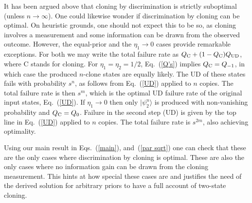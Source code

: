 \documentclass[aps,prl,twocolumn,showpacs]{revtex4}
\begin{document}
It has been argued above that cloning by discrimination is strictly suboptimal (unless $n\to \infty$).
One could likewise wonder if discrimination by cloning can be optimal. On heuristic grounds, one should not expect this to be so, as cloning involves a measurement and some information can be drawn from the observed outcome. However, the equal-prior and the $\eta_1\to 0$ cases provide remarkable exceptions. For both we may write the total failure rate as $Q_{\rm C} + (1-Q_{\rm C})Q_{\rm UD}$, where C stands for cloning. For $\eta_1 = \eta_2= 1/2$, Eq.~(\ref{Q's}) implies $Q_{\rm C}=Q_{-1}$, in which case the produced $n$-clone states are equally likely. The UD of these states fails with probability $s^{n}$, as follows from Eq.~(\ref{UD}) applied to $n$ copies. The total failure rate is then $s^m$, which is the optimal UD failure rate of the original input states, Eq.~(\ref{UD}). If $\eta_1\to 0$ then only $|\psi^n_2\rangle$ is produced with non-vanishing probability and  $Q_{\rm C}=Q_{0}$. Failure in the second step (UD) is given by the top line in Eq.~(\ref{UD}) applied to $n$ copies. The total failure rate is $s^{2m}$, also achieving optimality. 

Using our main result in Eqs.~(\ref{main}), and~(\ref{par sqrt}) one can check that these are the only cases where discrimination by cloning is optimal. These are also the only cases where no information gain can be drawn from the cloning measurement.  This hints at how special these cases are and justifies the need of the derived solution for arbitrary priors to have a full account of two-state cloning. 
\end{document}
